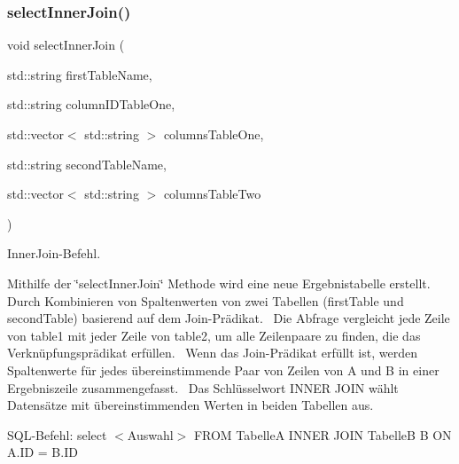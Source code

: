 \subsubsection{select\+Inner\+Join()}
{\footnotesize\ttfamily void select\+Inner\+Join (\begin{DoxyParamCaption}\item[{std\+::string}]{first\+Table\+Name,  }\item[{std\+::string}]{column\+I\+D\+Table\+One,  }\item[{std\+::vector$<$ std\+::string $>$}]{columns\+Table\+One,  }\item[{std\+::string}]{second\+Table\+Name,  }\item[{std\+::vector$<$ std\+::string $>$}]{columns\+Table\+Two }\end{DoxyParamCaption})}



Inner\+Join-\/\+Befehl. 

Mithilfe der \char`\"{}select\+Inner\+Join\char`\"{} Methode wird eine neue Ergebnistabelle erstellt.~\newline
 Durch Kombinieren von Spaltenwerten von zwei Tabellen (first\+Table und second\+Table) basierend auf dem Join-\/\+Prädikat.~\newline
 Die Abfrage vergleicht jede Zeile von table1 mit jeder Zeile von table2, um alle Zeilenpaare zu finden, die das Verknüpfungsprädikat erfüllen.~\newline
 Wenn das Join-\/\+Prädikat erfüllt ist, werden Spaltenwerte für jedes übereinstimmende Paar von Zeilen von A und B in einer Ergebniszeile zusammengefasst.~\newline
 Das Schlüsselwort I\+N\+N\+ER J\+O\+IN wählt Datensätze mit übereinstimmenden Werten in beiden Tabellen aus.~\newline


S\+Q\+L-\/\+Befehl\+: select $<$\+Auswahl$>$ F\+R\+OM TabelleA I\+N\+N\+ER J\+O\+IN TabelleB B ON A.\+ID = B.\+ID


